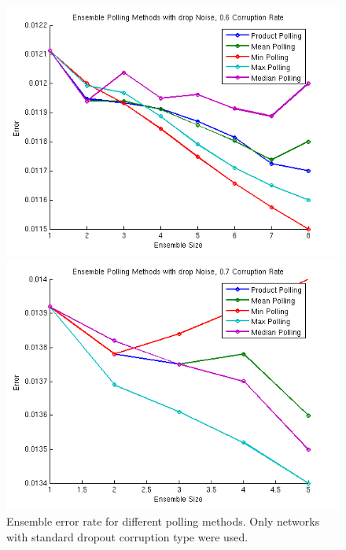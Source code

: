 \documentclass{article} %
\begin{document}
\begin{figure}[ht]
\begin{minipage}[b]{0.5\linewidth}
    \centering
    \includegraphics[width=\linewidth]{methods6} 
    \vspace{4ex}
  \end{minipage}%
  \begin{minipage}[b]{0.5\linewidth}
    \centering
    \includegraphics[width=\linewidth]{methods5} 
    \vspace{4ex}
  \end{minipage} 
  \caption{Ensemble error rate for different polling methods. Only networks with standard dropout corruption type were used.}
\end{figure}
\end{document}
